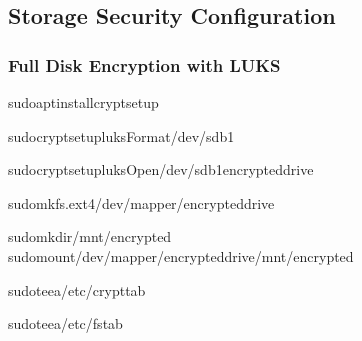 \documentclass[letterpaper,10pt,english]{sphinxmanual}
\begin{document}
\subsection{Storage Security Configuration}
\label{\detokenize{ubuntu-setup:storage-security-configuration}}

\subsubsection{Full Disk Encryption with LUKS}
\label{\detokenize{ubuntu-setup:full-disk-encryption-with-luks}}
\begin{sphinxVerbatim}[commandchars=\\\{\}]
sudoaptinstallcryptsetup

sudocryptsetupluksFormat/dev/sdb1

sudocryptsetupluksOpen/dev/sdb1encrypted\PYGZus{}drive

sudomkfs.ext4/dev/mapper/encrypted\PYGZus{}drive

sudomkdir/mnt/encrypted
sudomount/dev/mapper/encrypted\PYGZus{}drive/mnt/encrypted

sudotee\PYGZhy{}a/etc/crypttab

sudotee\PYGZhy{}a/etc/fstab
\end{sphinxVerbatim}
\end{document}
